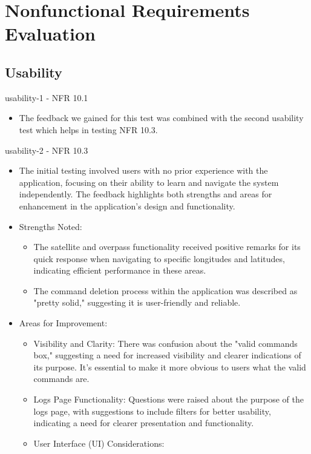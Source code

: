 \documentclass[12pt, titlepage]{article}
\begin{document}
\section{Nonfunctional Requirements Evaluation}

\subsection{Usability}

usability-1 - NFR 10.1
\begin{itemize}
    \item The feedback we gained for this test was combined with the second usability test which helps in testing NFR 10.3.
\end{itemize}

usability-2 - NFR 10.3
\begin{itemize}
    \item The initial testing involved users with no prior experience with the application, focusing on their ability to learn and navigate the system independently. The feedback highlights both strengths and areas for enhancement in the application's design and functionality.
    \item Strengths Noted:
    \begin{itemize}
        \item The satellite and overpass functionality received positive remarks for its quick response when navigating to specific longitudes and latitudes, indicating efficient performance in these areas.
        \item The command deletion process within the application was described as "pretty solid," suggesting it is user-friendly and reliable.
    \end{itemize}
    \item Areas for Improvement:
    \begin{itemize}
        \item Visibility and Clarity: There was confusion about the "valid commands box," suggesting a need for increased visibility and clearer indications of its purpose. It's essential to make it more obvious to users what the valid commands are.
        \item Logs Page Functionality: Questions were raised about the purpose of the logs page, with suggestions to include filters for better usability, indicating a need for clearer presentation and functionality.
        \item User Interface (UI) Considerations:
        \begin{itemize}

\end{itemize}
\end{itemize}
\end{itemize}
\end{document}
